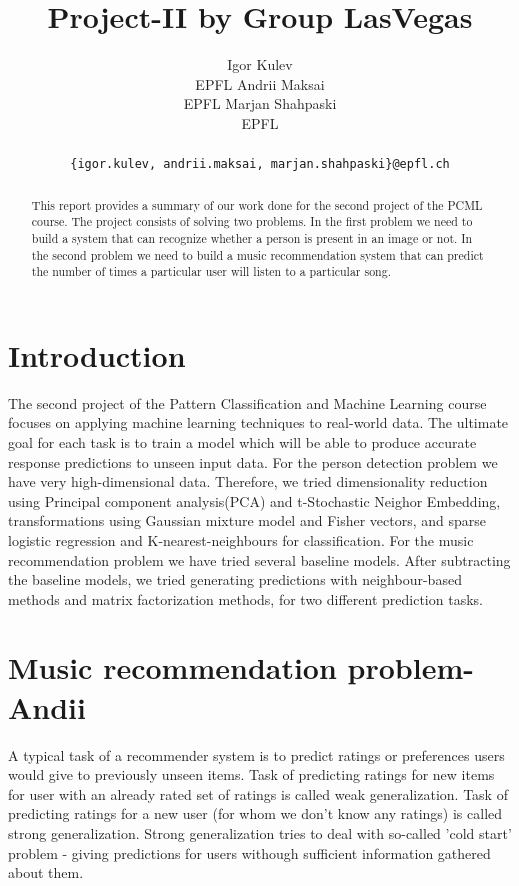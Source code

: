 \documentclass{article} %
\title{Project-II by Group LasVegas}
\author{
Igor Kulev \\
EPFL \And
Andrii Maksai \\
EPFL \And
Marjan Shahpaski \\
EPFL \\\\
\texttt{\{igor.kulev, andrii.maksai, marjan.shahpaski\}@epfl.ch}\\
}
\begin{document}
\maketitle

\begin{abstract}
This report provides a summary of our work done for the second project of the PCML course. 
The project consists of solving two problems. In the first problem we need to build a system 
that can recognize whether a person is present in an image or not. In the second problem 
we need to build a music recommendation system that can predict the number of times a particular 
user will listen to a particular song.
\end{abstract}

\section{Introduction}

The second project of the Pattern Classification and Machine Learning course focuses on applying machine 
learning techniques to real-world data. The ultimate goal for each task is to
train a model which will be able to produce accurate response predictions to unseen input data. 
For the person detection problem we have very high-dimensional data.
Therefore, we tried dimensionality reduction using Principal component
analysis(PCA) and t-Stochastic Neighor Embedding, 
transformations using Gaussian mixture model and Fisher vectors, and sparse
logistic regression and K-nearest-neighbours for classification.
For the music recommendation problem we have tried several baseline models.
After subtracting the baseline models, we tried generating predictions with neighbour-based 
methods and matrix factorization methods, for two different prediction tasks.

\section{Music recommendation problem-Andii}

A typical task of a recommender system is to predict ratings or preferences
users would give to previously unseen items. Task of predicting ratings for new
items for user with an already rated set of ratings is called weak
generalization. Task of predicting ratings for a new user (for whom we don't
know any ratings) is called strong generalization. Strong generalization tries
to deal with so-called 'cold start' problem - giving predictions for users
withough sufficient information gathered about them.
\end{document}
